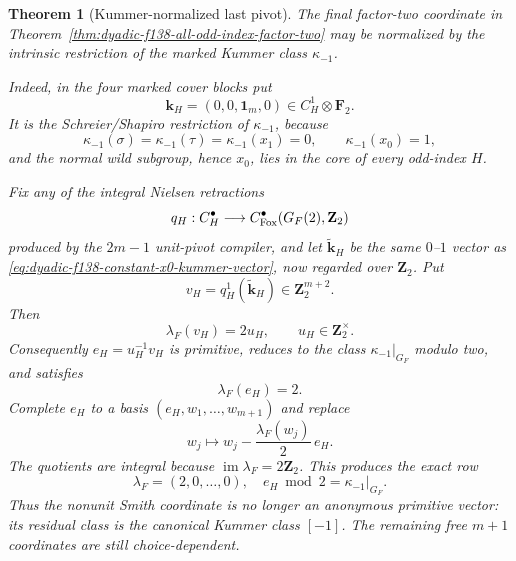 \documentclass[11pt]{article}
\newtheorem{theorem}{Theorem}[section]
\theoremstyle{definition}
\begin{document}
\begin{theorem}[Kummer-normalized last pivot]
\label{thm:dyadic-f138-kummer-normalized-last-pivot}
The final factor-two coordinate in
Theorem~\ref{thm:dyadic-f138-all-odd-index-factor-two}
may be normalized by the \emph{intrinsic}
restriction of the marked Kummer class
$\kappa_{-1}$.

Indeed, in the four marked cover blocks put
\begin{equation}\label{eq:dyadic-f138-constant-x0-kummer-vector}
\boxed{\qquad
\mathbf k_H=(0,0,\mathbf1_m,0)
\in C_H^1\otimes\mathbf F_2 .
\qquad}
\end{equation}
It is the Schreier/Shapiro restriction of
$\kappa_{-1}$, because
\[
\kappa_{-1}(\sigma)=
\kappa_{-1}(\tau)=
\kappa_{-1}(x_1)=0,\qquad
\kappa_{-1}(x_0)=1,
\]
and the normal wild subgroup, hence $x_0$, lies in
the core of every odd-index $H$.

Fix any of the integral Nielsen retractions
\[
q_H:C_H^\bullet\longrightarrow
C_{\rm Fox}^\bullet(G_F(2),\mathbf Z_2)
\]
produced by the $2m-1$ unit-pivot compiler, and
let $\widetilde{\mathbf k}_H$ be the same
$0$--$1$ vector as
\eqref{eq:dyadic-f138-constant-x0-kummer-vector},
now regarded over $\mathbf Z_2$.
Put
\[
v_H=q_H^1(\widetilde{\mathbf k}_H)
\in\mathbf Z_2^{m+2}.
\]
Then
\begin{equation}\label{eq:dyadic-f138-kummer-row-value}
\boxed{\qquad
\lambda_F(v_H)=2u_H,\qquad
u_H\in\mathbf Z_2^\times .
\qquad}
\end{equation}
Consequently
$e_H=u_H^{-1}v_H$ is primitive,
reduces to the class $\kappa_{-1}|_{G_F}$ modulo
two, and satisfies
\[
\lambda_F(e_H)=2.
\]
Complete $e_H$ to a basis
$(e_H,w_1,\ldots,w_{m+1})$ and replace
\[
w_j\longmapsto
w_j-\frac{\lambda_F(w_j)}2\,e_H .
\]
The quotients are integral because
$\operatorname{im}\lambda_F=2\mathbf Z_2$.
This produces the exact row
\begin{equation}\label{eq:dyadic-f138-kummer-normalized-row}
\boxed{\qquad
\lambda_F=(2,0,\ldots,0),
\quad
e_H\bmod2=\kappa_{-1}|_{G_F}.
\qquad}
\end{equation}
Thus the nonunit Smith coordinate is no longer an
anonymous primitive vector: its residual class is
the canonical Kummer class $[-1]$.
The remaining free $m+1$ coordinates are still
choice-dependent.
\end{theorem}
\end{document}
